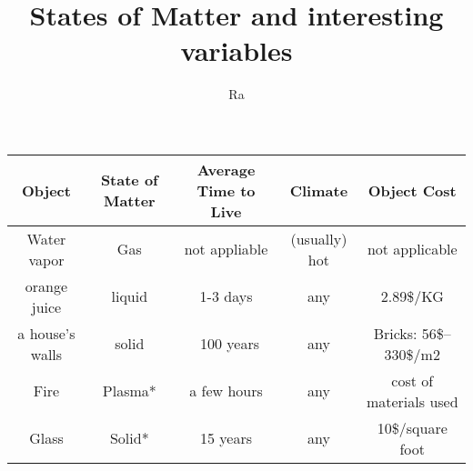 \documentclass[12px]{article}
\title{States of Matter and interesting variables}
\author{Ra}
\renewcommand{\maketitle}{
        \begin{center}

        {\huge\bfseries \thetitle}
        \newline

        \vspace{.25em}

        \end{center}
}
\begin{document}
  \maketitle
  \begin{center}
	  \begin{tabular}{|c|c|c|c|c|}
	  \hline
		  \textbf{Object} & \textbf{State of Matter} & \textbf{Average Time to Live} & \textbf{Climate}  & \textbf{Object Cost} \\
	  \hline
		  Water vapor & Gas &  not appliable & (usually) hot & not applicable \\
	  \hline
		  orange juice & liquid & 1-3 days \parencite{orangejuicelife} & any & 2.89\$/KG \parencite{orangejuicecost}  \\
	  \hline
		  a house's walls & solid & ~100 years \parencite{glasslife} & any & Bricks: 56\$–330\$/m2 \parencite{wallcost} \\
	  \hline
		  Fire & Plasma* & a few hours & any & cost of materials used \\
	  \hline
		  Glass & Solid* & 15 years \parencite{glasslife} & any & 10\$/square foot \parencite{glasscost} \\
	  \hline

          \end{tabular}
  \end{center}
\end{document}
